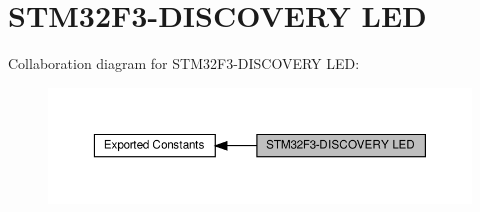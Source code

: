 \hypertarget{group__STM32F3__DISCOVERY__LED}{}\section{S\+T\+M32\+F3-\/\+D\+I\+S\+C\+O\+V\+E\+RY L\+ED}
\label{group__STM32F3__DISCOVERY__LED}
Collaboration diagram for S\+T\+M32\+F3-\/\+D\+I\+S\+C\+O\+V\+E\+RY L\+ED\+:\nopagebreak
\begin{figure}[H]
\begin{center}
\leavevmode
\includegraphics[width=350pt]{group__STM32F3__DISCOVERY__LED}
\end{center}
\end{figure}

